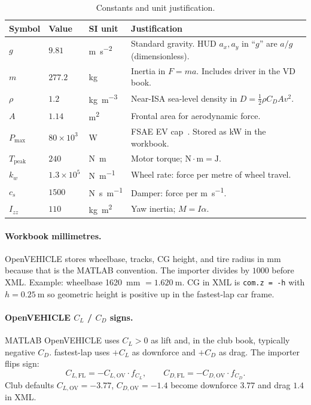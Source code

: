 \documentclass[11pt,letterpaper]{article}
\begin{document}
\begin{table}[ht]
\centering
\caption{Constants and unit justification.}
\begin{tabular}{@{}llll@{}}
\toprule
Symbol      & Value              & SI unit & Justification \\
\midrule
$g$         & $9.81$             & \si{\metre\per\second\squared}
            & Standard gravity. HUD $a_x,a_y$ in ``$g$'' are $a/g$
              (dimensionless). \\
$m$         & $277.2$            & \si{\kilo\gram}
            & Inertia in $F=ma$. Includes driver in the VD book. \\
$\rho$      & $1.2$              & \si{\kilo\gram\per\metre\cubed}
            & Near-ISA sea-level density in
              $D=\tfrac12\rho C_D A v^2$. \\
$A$         & $1.14$             & \si{\metre\squared}
            & Frontal area for aerodynamic force. \\
$P_{\max}$  & $80\times10^3$     & \si{\watt}
            & FSAE EV cap~\cite{fsae-rules}. Stored as \si{\kilo\watt}
              in the workbook. \\
$T_{\mathrm{peak}}$ & $240$      & \si{\newton\metre}
            & Motor torque; $\mathrm{N\cdot m} = \mathrm{J}$. \\
$k_w$       & $1.3\times10^5$    & \si{\newton\per\metre}
            & Wheel rate: force per metre of wheel travel. \\
$c_s$       & $1500$             & \si{\newton\second\per\metre}
            & Damper: force per \si{\metre\per\second}. \\
$I_{zz}$    & $110$              & \si{\kilo\gram\metre\squared}
            & Yaw inertia; $M = I\alpha$. \\
\bottomrule
\end{tabular}
\end{table}

\paragraph{Workbook millimetres.}
OpenVEHICLE stores wheelbase, tracks, CG height, and tire radius in
\si{\milli\metre} because that is the MATLAB convention. The importer
divides by $1000$ before XML. Example: wheelbase
\SI{1620}{\milli\metre} $= \SI{1.620}{\metre}$. CG in XML is
\texttt{com.z = -h} with $h=\SI{0.25}{\metre}$ so geometric height is
positive up in the fastest-lap car frame.

\paragraph{OpenVEHICLE $C_L$ / $C_D$ signs.}
MATLAB OpenVEHICLE uses $C_L>0$ as lift and, in the club book,
typically negative $C_D$. fastest-lap uses $+C_L$ as downforce and
$+C_D$ as drag. The importer flips sign:
\[
  C_{L,\mathrm{FL}} = -C_{L,\mathrm{OV}}\cdot f_{C_L},\qquad
  C_{D,\mathrm{FL}} = -C_{D,\mathrm{OV}}\cdot f_{C_D}.
\]
Club defaults $C_{L,\mathrm{OV}}=-3.77$, $C_{D,\mathrm{OV}}=-1.4$ become
downforce $3.77$ and drag $1.4$ in XML.
\end{document}
